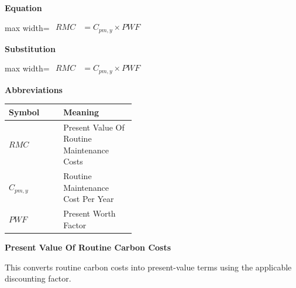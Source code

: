 \documentclass{article}
\begin{document}
\vspace{0.4em}
\textbf{Equation}\par\vspace{-0.35em}
\begin{center}
\begin{adjustbox}{max width=\linewidth}
$\displaystyle\begin{aligned}
RMC &= C_{pm,y} \times PWF
\end{aligned}$
\end{adjustbox}
\end{center}
\vspace{0.4em}
\textbf{Substitution}\par\vspace{-0.35em}
\begin{center}
\begin{adjustbox}{max width=\linewidth}
$\displaystyle\begin{aligned}
RMC &= C_{pm,y} \times PWF
\end{aligned}$
\end{adjustbox}
\end{center}
\vspace{0.4em}
\textbf{Abbreviations}\par\vspace{-0.35em}
\begin{tabularx}{\linewidth}{>{\raggedright\arraybackslash}p{0.43\linewidth} >{\raggedright\arraybackslash}X}
\toprule
Symbol & Meaning \\
\midrule
$RMC$ & Present Value Of Routine Maintenance Costs \\
$C_{pm,y}$ & Routine Maintenance Cost Per Year \\
$PWF$ & Present Worth Factor \\
\bottomrule
\end{tabularx}
\vspace{0.6em}
\vspace{0.4em}
\textbf{Present Value Of Routine Carbon Costs}\par\vspace{-0.35em}
This converts routine carbon costs into present-value terms using the applicable discounting factor.
\end{document}

